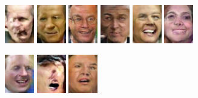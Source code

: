 \begin{figure}[!h]
{        \includegraphics[scale=1]{figures/lfw/appendix3/lfw64x48color_image0042.png}
        \includegraphics[scale=1]{figures/lfw/appendix3/lfw64x48color_image0043.png}
        \includegraphics[scale=1]{figures/lfw/appendix3/lfw64x48color_image0044.png}
        \includegraphics[scale=1]{figures/lfw/appendix3/lfw64x48color_image0045.png}
        \includegraphics[scale=1]{figures/lfw/appendix3/lfw64x48color_image0046.png}
        \includegraphics[scale=1]{figures/lfw/appendix3/lfw64x48color_image0047.png}
    }
    \vspace{0.1cm}
    \centerline{
        \includegraphics[scale=1]{figures/lfw/appendix3/lfw64x48color_image0048.png}
        \includegraphics[scale=1]{figures/lfw/appendix3/lfw64x48color_image0049.png}
        \includegraphics[scale=1]{figures/lfw/appendix3/lfw64x48color_image0050.png}
}
\end{figure}
